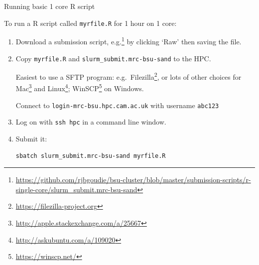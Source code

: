 \documentclass[t,10pt]{beamer}
\let\oldfootnote\footnote
\renewcommand\footnote[1][]{\oldfootnote[frame,#1]}
\begin{document}
\begin{frame}[fragile]{Running basic 1 core R script}

To run a R script called \texttt{myrfile.R} for 1 hour on 1 core:

\begin{enumerate}
\item Download  a submission script, e.g.\footnote{\url{https://github.com/rjbgoudie/bsu-cluster/blob/master/submission-scripts/r-single-core/slurm_submit.mrc-bsu-sand}} by clicking `Raw' then saving the file.

\item Copy \texttt{myrfile.R} and \texttt{slurm_submit.mrc-bsu-sand} to the HPC.

Easiest to use a SFTP program: e.g.\ Filezilla\footnote{\url{https://filezilla-project.org}}, or lots of other choices for Mac\footnote{\url{http://apple.stackexchange.com/a/25667}} and Linux\footnote{\url{http://askubuntu.com/a/109020}}; WinSCP\footnote{\url{https://winscp.net/}} on Windows.

Connect to \texttt{login-mrc-bsu.hpc.cam.ac.uk} with username \texttt{abc123}

\item Log on with \texttt{ssh hpc} in a command line window.

\item Submit it:
\begin{verbatim}
sbatch slurm_submit.mrc-bsu-sand myrfile.R
\end{verbatim}
\end{enumerate}
\end{frame}

\end{document}
